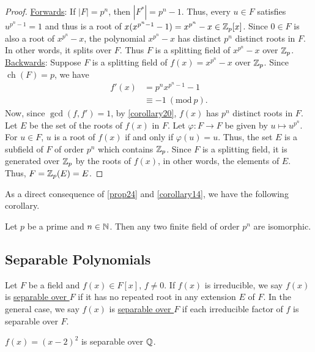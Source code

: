 \documentclass[11pt]{article}
\newcommand{\Mod}[1]{\ (\mathrm{mod}\ #1)}
\DeclareMathOperator{\ch}{ch}
\begin{document}
\begin{proof}
\underline{Forwards}: If $|F| = p^n$, then $|F^*|= p^n - 1$. Thus, every $u \in
F$ satisfies $u^{p^n-1} = 1$ and thus is a root of $x(x^{p^n-1} - 1) =
x^{p^n} - x \in \mathbb{Z}_p[x]$. Since $0 \in F$ is also a root of $x^{p^n} - x$, the
polynomial $x^{p^n} - x$ has distinct $p^n$ distinct roots in $F$. In other
words, it splits over $F$. Thus $F$ is a splitting field of $x^{p^n} - x$ over
$\mathbb{Z}_p$.\\
\underline{Backwards}: Suppose $F$ is a splitting field of $f(x) = x^{p^n} - x$
over $\mathbb{Z}_p$. Since $\ch(F) = p$, we have
\begin{align*}
f'(x) &= p^nx^{p^n-1} - 1\\
&\equiv -1 \Mod{p}.
\end{align*}
Now, since $\gcd(f,f') = 1$, by \cref{corollary20}, $f(x)$ has $p^n$ distinct
roots in $F$. Let $E$ be the set of the roots of $f(x)$ in $F$. Let $\varphi:F \to
F$ be given by $u \mapsto u^{p^n}$. For $u \in F$, $u$ is a root of $f(x)$ if
and only if $\varphi(u) = u$. Thus, the set $E$ is a subfield of $F$ of order $p^n$
which contains $\mathbb{Z}_p$. Since $F$ is a splitting field, it is generated over
$\mathbb{Z}_p$ by the roots of $f(x)$, in other words, the elements of $E$. Thus,
$F = \mathbb{Z}_p(E) = E$.
\end{proof}
As a direct consequence of \cref{prop24} and \cref{corollary14}, we have the
following corollary.
\begin{corollary}[E. H. Moore]
Let $p$ be a prime and $n \in \mathbb{N}$. Then any two finite field of order $p^n$ are
isomorphic.
\label{corollary25}
\end{corollary}

\subsection{Separable Polynomials}
\begin{definition}
Let $F$ be a field and $f(x) \in F[x]$, $f \neq 0$. If $f(x)$ is irreducible, we
say $f(x)$ is \underline{separable over $F$} if it has no repeated root in any
extension $E$ of $F$. In the general case, we say $f(x)$ is \underline{separable
over $F$} if each irreducible factor of $f$ is separable over $F$.
\end{definition}

\begin{example}
$f(x) = (x-2)^2$ is separable over $\mathbb{Q}$.
\end{example}
\end{document}
